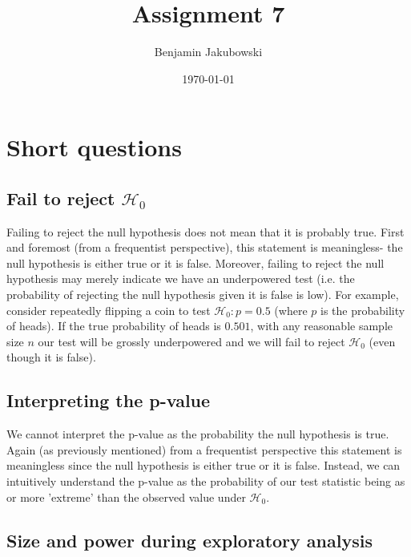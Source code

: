 \documentclass[paper=a4, fontsize=11pt]{scrartcl} %
\title{	Assignment 7}
\author{Benjamin Jakubowski} %
\date{\normalsize\today} %
\numberwithin{equation}{section} %
\numberwithin{figure}{section} %
\numberwithin{table}{section} %
\begin{document}
\maketitle %


\section{Short questions}

\subsection{Fail to reject $\mathcal{H}_0$}

Failing to reject the null hypothesis does not mean that it is probably true. First and foremost (from a frequentist perspective), this statement is meaningless- the null hypothesis is either true or it is false. Moreover, failing to reject the null hypothesis may merely indicate we have an underpowered test (i.e. the probability of rejecting the null hypothesis given it is false is low). For example, consider repeatedly flipping a coin to test $\mathcal{H}_0: p = 0.5$ (where $p$ is the probability of heads). If the true probability of heads is $0.501$, with any reasonable sample size $n$ our test will be grossly underpowered and we will fail to reject $\mathcal{H}_0$ (even though it is false).

\subsection{Interpreting the p-value}

We cannot interpret the p-value as the probability the null hypothesis is true. Again (as previously mentioned) from a frequentist perspective this statement is meaningless since the null hypothesis is either true or it is false. Instead, we can intuitively understand the p-value as the probability of our test statistic being as or more 'extreme' than the observed value under $\mathcal{H}_0$.

\subsection{Size and power during exploratory analysis}
\end{document}

